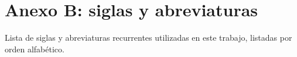 \cleardoublepage{}
{}
\FormatoAnexoB

\RemoveLabelsAxUno

\AddLabelsAxDos

\let\originalstyle=\thispagestyle            %
\def\thispagestyle#1{\fancyfoot[C]{}}       %
\def\thispagestyle#1{\originalstyle{empty}} %
\def\thispagestyle#1{}                       %

\chapter*{Anexo B: siglas y abreviaturas}

\noindent Lista de siglas y abreviaturas recurrentes utilizadas en este trabajo, listadas por orden alfabético.
\vspace*{0.6cm}
\begin{normalsize}  		 %
\printacronyms[heading=none]
\end{normalsize}

\let\thispagestyle=\originalstyle 